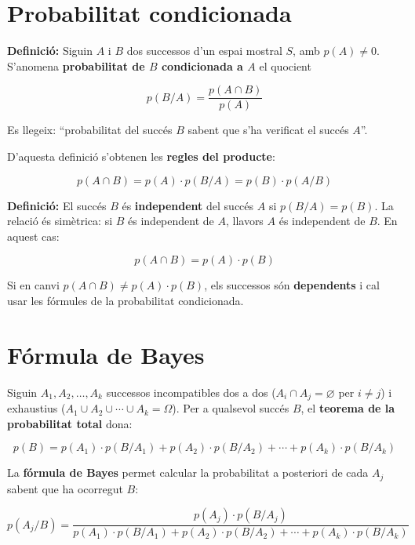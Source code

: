 \section{Probabilitat condicionada}

\textbf{Definició:} Siguin $A$ i $B$ dos successos d'un espai mostral $S$, amb $p(A) \neq 0$. S'anomena \textbf{probabilitat de $B$ condicionada a $A$} el quocient

\begin{equation}
p(B/A) = \frac{p(A\cap B)}{p(A)}
\end{equation}

Es llegeix: ``probabilitat del succés $B$ sabent que s'ha verificat el succés $A$''.

D'aquesta definició s'obtenen les \textbf{regles del producte}:

\begin{equation*}
p(A\cap B) = p(A)\cdot p(B/A) = p(B)\cdot p(A/B)
\end{equation*}

\textbf{Definició:} El succés $B$ és \textbf{independent} del succés $A$ si $p(B/A) = p(B)$. La relació és simètrica: si $B$ és independent de $A$, llavors $A$ és independent de $B$. En aquest cas:

\begin{equation}
p(A\cap B) = p(A)\cdot p(B)
\end{equation}

Si en canvi $p(A\cap B) \neq p(A)\cdot p(B)$, els successos són \textbf{dependents} i cal usar les fórmules de la probabilitat condicionada.

\section{Fórmula de Bayes}

Siguin $A_1, A_2, \ldots, A_k$ successos incompatibles dos a dos ($A_i\cap A_j = \varnothing$ per $i \neq j$) i exhaustius ($A_1\cup A_2\cup\cdots\cup A_k = \Omega$). Per a qualsevol succés $B$, el \textbf{teorema de la probabilitat total} dona:

\begin{equation*}
p(B) = p(A_1)\cdot p(B/A_1) + p(A_2)\cdot p(B/A_2) + \cdots + p(A_k)\cdot p(B/A_k)
\end{equation*}

La \textbf{fórmula de Bayes} permet calcular la probabilitat a posteriori de cada $A_j$ sabent que ha ocorregut $B$:

\begin{equation*}
p(A_j/B) = \frac{p(A_j)\cdot p(B/A_j)}{p(A_1)\cdot p(B/A_1) + p(A_2)\cdot p(B/A_2) + \cdots + p(A_k)\cdot p(B/A_k)}
\end{equation*}


